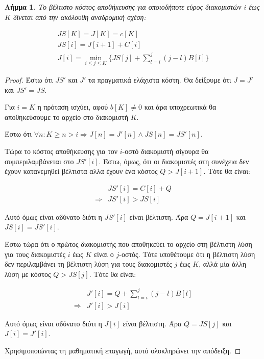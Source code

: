 \documentclass[11pt,a4paper]{book}
\newtheorem*{lemma}{Λήμμα}
\begin{document}
\begin{lemma}
Το βέλτιστο κόστος αποθήκευσης για οποιοδήποτε εύρος διακομιστών $i$ έως $K$ δίνεται από την ακόλουθη αναδρομική σχέση:

\begin{align*}
	JS[ K ] = J[ K ] = c[ K ]\\
	JS[ i ] = J[ i + 1 ] + C[ i ]\\
	J[ i ] = \min_{i \leq j \leq K}\{ JS[ j ] + \sum_{l=i}^j{(j - l)B[l]} \}
\end{align*}
\end{lemma}
\begin{proof}
Έστω ότι $JS'$ και $J'$ τα πραγματικά ελάχιστα κόστη. Θα δείξουμε ότι $J = J'$ και $JS' = JS$.

Για $i = K$ η πρόταση ισχύει, αφού $b[ K ] \neq 0$ και άρα υποχρεωτικά θα αποθηκεύσουμε το αρχείο στο διακομιστή $K$.

Έστω ότι $\forall n: K \geq n > i \Rightarrow J[ n ] = J'[ n ] \land JS[ n ] = JS'[ n ]$.

Τώρα το κόστος αποθήκευσης για τον $i$-οστό διακομιστή σίγουρα θα συμπεριλαμβάνεται στο $JS'[ i ]$. Έστω, όμως, ότι οι διακομιστές στη συνέχεια δεν έχουν κατανεμηθεί βέλτιστα αλλα έχουν ένα κόστος $Q > J[ i + 1 ]$. Τότε θα είναι:

\begin{align*}
            & JS'[ i ] = C[ i ] + Q\\
\Rightarrow & JS'[ i ] > JS[ i ]
\end{align*}

Αυτό όμως είναι αδύνατο διότι η $JS'[ i ]$ είναι βέλτιστη. Άρα $Q = J[ i + 1 ]$ και $JS[ i ] = JS'[ i ]$.

Έστω τώρα ότι ο πρώτος διακομιστής που αποθηκεύει το αρχείο στη βέλτιστη λύση για τους διακομιστές $i$ έως $K$ είναι ο $j$-οστός. Τότε υποθέτουμε ότι η βέλτιστη λύση δεν περιλαμβάνει τη βέλτιστη λύση για τους διακομιστές $j$ έως $K$, αλλά μία άλλη λύση με κόστος $Q > JS[ j ]$. Τότε θα είναι:

\begin{align*}
            & J'[ i ] = Q + \sum_{l=i}^j{(j - l)B[l]}\\
\Rightarrow & J'[ i ] > J[ i ]
\end{align*}

Αυτό όμως είναι αδύνατο διότι η $J[ i ]$ είναι βέλτιστη. Άρα $Q = JS[ j ]$ και $J[ i ] = J'[ i ]$.

Χρησιμοποιώντας τη μαθηματική επαγωγή, αυτό ολοκληρώνει την απόδειξη.

\end{proof}
\end{document}
